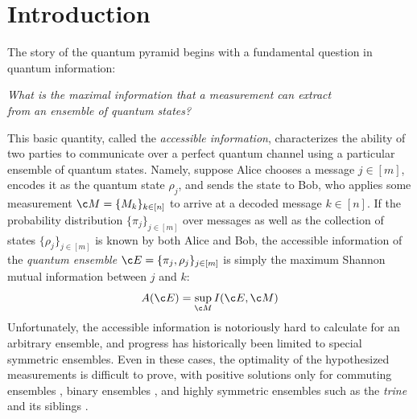 \documentclass[11pt]{article}
\begin{document}
\section{Introduction}
The story of the quantum pyramid begins with a fundamental question in quantum information:
\begin{center}
    \textit{What is the maximal information that a measurement can extract \\from an ensemble of quantum states? }
\end{center}
This basic quantity, called the \textit{accessible information}, characterizes the ability of two parties to communicate over a perfect quantum channel using a particular ensemble of quantum states. Namely, suppose Alice chooses a message $j\in[m]$, encodes it as the quantum state $\rho_j $, and sends the state to Bob, who applies some measurement $\c M=\{M_k\}_{k\in [n]}$ to arrive at a decoded message $k\in [n]$. If the probability distribution $\{\pi_j\}_{j\in [m]}$ over messages as well as the collection of states $\{\rho_j\}_{j\in [m]}$ is known by both Alice and Bob, the accessible information of the \textit{quantum ensemble} $\c E =\{\pi_j,\rho_j\}_{j\in [m]}$ is simply the maximum Shannon mutual information between $j$ and $k$:
\begin{equation}\label{eq:A-sup}
    A({\c E})=\sup_{\c M }I({\c E},{\c M})
\end{equation}
Unfortunately, the accessible information is notoriously hard to calculate for an arbitrary ensemble, and progress has historically been limited to special symmetric ensembles. Even in these cases, the optimality of the hypothesized measurements is difficult to prove, with positive solutions only for commuting ensembles \citep{suzuki2008accessible}, binary ensembles \citep{levitin1995optimal, keil2024proof}, and highly symmetric ensembles such as the \textit{trine} and its siblings \citep{sasaki1999accessible}. 
\end{document}
